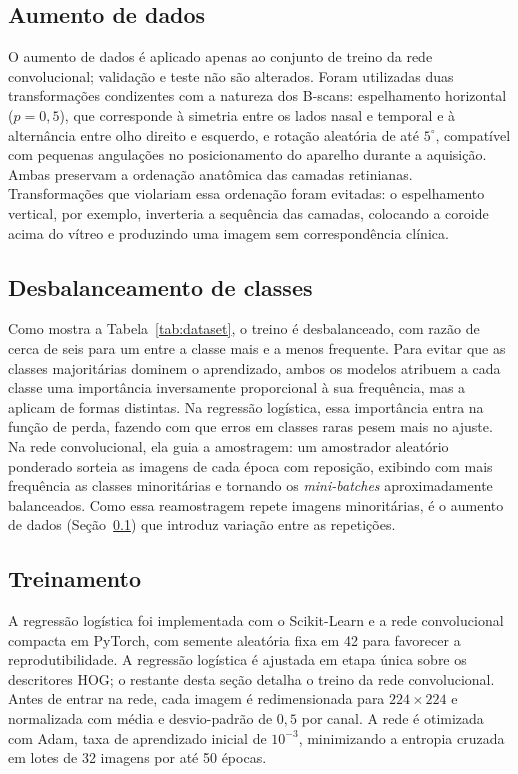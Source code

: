 \documentclass[conference]{IEEEtran}
\begin{document}
\subsection{Aumento de dados}
\label{subsec:aumento}

O aumento de dados é aplicado apenas ao conjunto de treino da rede convolucional; validação e teste não são alterados. Foram utilizadas duas transformações condizentes com a natureza dos B-scans: espelhamento horizontal ($p=0{,}5$), que corresponde à simetria entre os lados nasal e temporal e à alternância entre olho direito e esquerdo, e rotação aleatória de até $5^\circ$, compatível com pequenas angulações no posicionamento do aparelho durante a aquisição. Ambas preservam a ordenação anatômica das camadas retinianas. Transformações que violariam essa ordenação foram evitadas: o espelhamento vertical, por exemplo, inverteria a sequência das camadas, colocando a coroide acima do vítreo e produzindo uma imagem sem correspondência clínica.

\subsection{Desbalanceamento de classes}
\label{subsec:desbalanceamento}

Como mostra a Tabela~\ref{tab:dataset}, o treino é desbalanceado, com razão de cerca de seis para um entre a classe mais e a menos frequente. Para evitar que as classes majoritárias dominem o aprendizado, ambos os modelos atribuem a cada classe uma importância inversamente proporcional à sua frequência, mas a aplicam de formas distintas. Na regressão logística, essa importância entra na função de perda, fazendo com que erros em classes raras pesem mais no ajuste. Na rede convolucional, ela guia a amostragem: um amostrador aleatório ponderado sorteia as imagens de cada época com reposição, exibindo com mais frequência as classes minoritárias e tornando os \textit{mini-batches} aproximadamente balanceados. Como essa reamostragem repete imagens minoritárias, é o aumento de dados (Seção~\ref{subsec:aumento}) que introduz variação entre as repetições.

\subsection{Treinamento}
\label{subsec:treino}

A regressão logística foi implementada com o Scikit-Learn e a rede convolucional compacta em PyTorch, com semente aleatória fixa em 42 para favorecer a reprodutibilidade. A regressão logística é ajustada em etapa única sobre os descritores HOG; o restante desta seção detalha o treino da rede convolucional. Antes de entrar na rede, cada imagem é redimensionada para $224\times224$ e normalizada com média e desvio-padrão de $0{,}5$ por canal. A rede é otimizada com Adam, taxa de aprendizado inicial de $10^{-3}$, minimizando a entropia cruzada em lotes de 32 imagens por até 50 épocas.
\end{document}
